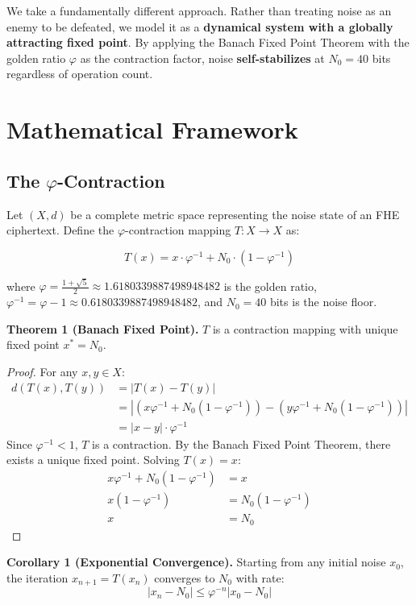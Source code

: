 \documentclass{article}
\begin{document}
We take a fundamentally different approach. Rather than treating noise as an enemy to be defeated, we model it as a \textbf{dynamical system with a globally attracting fixed point}. By applying the Banach Fixed Point Theorem with the golden ratio $\varphi$ as the contraction factor, noise \textbf{self-stabilizes} at $N_0 = 40$ bits regardless of operation count.

\section{Mathematical Framework}

\subsection{The $\varphi$-Contraction}

Let $(X, d)$ be a complete metric space representing the noise state of an FHE ciphertext. Define the $\varphi$-contraction mapping $T: X \to X$ as:

\begin{equation}
T(x) = x \cdot \varphi^{-1} + N_0 \cdot (1 - \varphi^{-1})
\end{equation}

where $\varphi = \frac{1 + \sqrt{5}}{2} \approx 1.6180339887498948482$ is the golden ratio, $\varphi^{-1} = \varphi - 1 \approx 0.6180339887498948482$, and $N_0 = 40$ bits is the noise floor.

\textbf{Theorem 1 (Banach Fixed Point).} $T$ is a contraction mapping with unique fixed point $x^* = N_0$.

\begin{proof}
For any $x, y \in X$:
\begin{align}
d(T(x), T(y)) &= |T(x) - T(y)| \\
&= |(x\varphi^{-1} + N_0(1-\varphi^{-1})) - (y\varphi^{-1} + N_0(1-\varphi^{-1}))| \\
&= |x - y| \cdot \varphi^{-1}
\end{align}
Since $\varphi^{-1} < 1$, $T$ is a contraction. By the Banach Fixed Point Theorem, there exists a unique fixed point. Solving $T(x) = x$:
\begin{align}
x\varphi^{-1} + N_0(1 - \varphi^{-1}) &= x \\
x(1 - \varphi^{-1}) &= N_0(1 - \varphi^{-1}) \\
x &= N_0
\end{align}
\end{proof}

\textbf{Corollary 1 (Exponential Convergence).} Starting from any initial noise $x_0$, the iteration $x_{n+1} = T(x_n)$ converges to $N_0$ with rate:
\begin{equation}
|x_n - N_0| \leq \varphi^{-n} |x_0 - N_0|
\end{equation}
\end{document}

